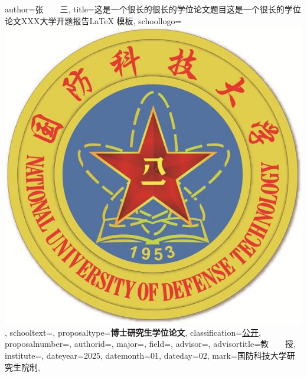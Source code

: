 \documentclass{NUDTproposal}
\begin{document}
\NUDTvalueset
{
    author={张~~~~三},                %
    title={这是一个很长的很长的学位论文题目这是一个很长的学位论文XXX大学开题报告\LaTeX{} 模板},                          %
    schoollogo={\includegraphics[scale=0.13]{nudt_logo_new}},
    schooltext={},
    proposaltype={\textbf{博士研究生学位论文}}, %
    classification={\underline{\qquad 公开\qquad}},          %
    proposalnumber={\underline{\makebox[3cm][c]{~~}}},  %
    authorid={},            %
    major={},         %
    field={},               %
    advisor={},               %
    advisortitle={教~~~~授},        %
    institute={}, %
    dateyear={2025},      %
    datemonth={01},      %
    dateday={02},      %
    mark={国防科技大学研究生院制},  %
}

\makecover



%
\clearpage

%
\clearpage

%
\clearpage

%
\clearpage
\end{document}

